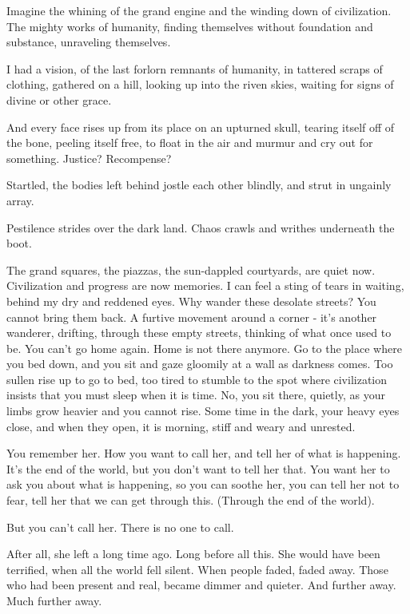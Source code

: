 
Imagine the whining of the grand engine and the winding down of
civilization. The mighty works of humanity, finding themselves without
foundation and substance, unraveling themselves.

I had a vision, of the last forlorn remnants of humanity, in tattered
scraps of clothing, gathered on a hill, looking up into the riven skies,
waiting for signs of divine or other grace.

And every face rises up from its place on an upturned skull, tearing
itself off of the bone, peeling itself free, to float in the air and
murmur and cry out for something. Justice? Recompense?

Startled, the bodies left behind jostle each other blindly, and strut in
ungainly array.

Pestilence strides over the dark land. Chaos crawls and writhes
underneath the boot.

The grand squares, the piazzas, the sun-dappled courtyards, are quiet
now. Civilization and progress are now memories. I can feel a sting of
tears in waiting, behind my dry and reddened eyes. Why wander these
desolate streets? You cannot bring them back. A furtive movement around
a corner - it's another wanderer, drifting, through these empty streets,
thinking of what once used to be. You can't go home again. Home is not
there anymore. Go to the place where you bed down, and you sit and gaze
gloomily at a wall as darkness comes. Too sullen rise up to go to bed,
too tired to stumble to the spot where civilization insists that you
must sleep when it is time. No, you sit there, quietly, as your limbs
grow heavier and you cannot rise. Some time in the dark, your heavy eyes
close, and when they open, it is morning, stiff and weary and unrested.

You remember her. How you want to call her, and tell her of what is
happening. It's the end of the world, but you don't want to tell her
that. You want her to ask you about what is happening, so you can soothe
her, you can tell her not to fear, tell her that we can get through
this. (Through the end of the world).

But you can't call her. There is no one to call.

After all, she left a long time ago. Long before all this. She would
have been terrified, when all the world fell silent. When people faded,
faded away. Those who had been present and real, became dimmer and
quieter. And further away. Much further away.

